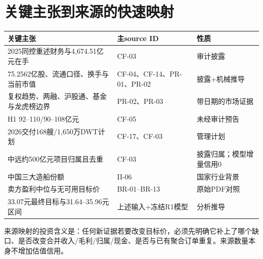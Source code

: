 \section{关键主张到来源的快速映射}

\begin{exhibitbox}[复核索引]
\small
\begin{tabularx}{\exhibitboxwidth}{L{6.0cm}L{3.4cm}X}
\toprule
\textbf{关键主张} & \textbf{主source ID} & \textbf{性质} \\
\midrule
2025同控重述财务与4,674.51亿元在手 & CF-03 & 审计披露 \\
75.2562亿股、流通口径、换手与当前市值 & CF-04、CF-14、PR-01、PR-02 & 披露+机械推导 \\
复权趋势、两融、沪股通、基金与龙虎榜边界 & PR-02、PR-03 & 带日期的市场证据 \\
H1 92--110/90--108亿元 & CF-05 & 未经审计预告 \\
2026交付168艘/1,650万DWT计划 & CF-17、CF-03 & 管理计划 \\
中远约500亿元项目归属且去重 & CF-03 & 披露归属；模型增量信用0 \\
中国三大造船份额 & II-06 & 国家行业背景 \\
卖方盈利中位与无可用目标价 & BR-01--BR-13 & 原始PDF对照 \\
33.07元最终目标与31.64--35.96元区间 & 上述输入+冻结R1模型 & 分析推导 \\
\bottomrule
\end{tabularx}
\end{exhibitbox}

来源映射的投资含义是：任何新证据若要改变目标价，必须先明确它补上了哪个缺口、是否改变合并收入/毛利/归属/现金、是否与已有聚合订单重复。来源数量本身不增加估值信用。
